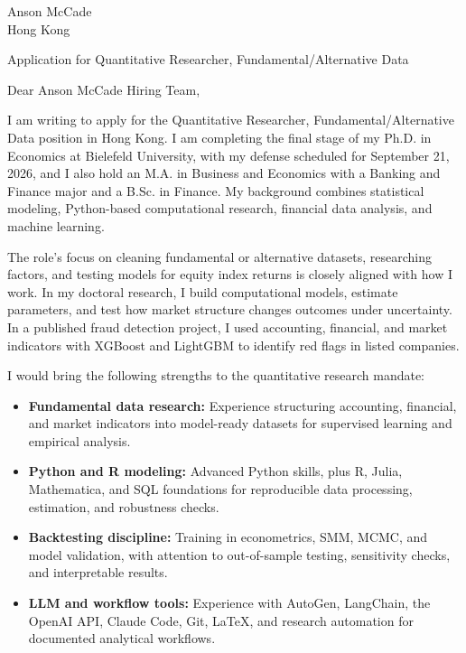 \documentclass[11pt]{article}
\begin{document}
\vspace{0.1cm}

\noindent
Anson McCade \\
Hong Kong

\vspace{0.1cm}

\noindent
Application for Quantitative Researcher, Fundamental/Alternative Data \\

\vspace{0.05cm}

\noindent Dear Anson McCade Hiring Team,

I am writing to apply for the Quantitative Researcher, Fundamental/Alternative Data position in Hong Kong. 
I am completing the final stage of my Ph.D. in Economics at Bielefeld University, with my defense scheduled for September 21, 2026, 
and I also hold an M.A. in Business and Economics with a Banking and Finance major and a B.Sc. in Finance. 
My background combines statistical modeling, Python-based computational research, financial data analysis, and machine learning.

The role's focus on cleaning fundamental or alternative datasets, researching factors, and testing models for equity index returns is closely aligned with how I work. 
In my doctoral research, I build computational models, estimate parameters, and test how market structure changes outcomes under uncertainty. 
In a published fraud detection project, I used accounting, financial, and market indicators with XGBoost and LightGBM to identify red flags in listed companies.

I would bring the following strengths to the quantitative research mandate:

\begin{itemize}
    \item \textbf{Fundamental data research:} Experience structuring accounting, financial, and market indicators into model-ready datasets for supervised learning and empirical analysis.
    \item \textbf{Python and R modeling:} Advanced Python skills, plus R, Julia, Mathematica, and SQL foundations for reproducible data processing, estimation, and robustness checks.
    \item \textbf{Backtesting discipline:} Training in econometrics, SMM, MCMC, and model validation, with attention to out-of-sample testing, sensitivity checks, and interpretable results.
    \item \textbf{LLM and workflow tools:} Experience with AutoGen, LangChain, the OpenAI API, Claude Code, Git, LaTeX, and research automation for documented analytical workflows.
\end{itemize}
\end{document}
